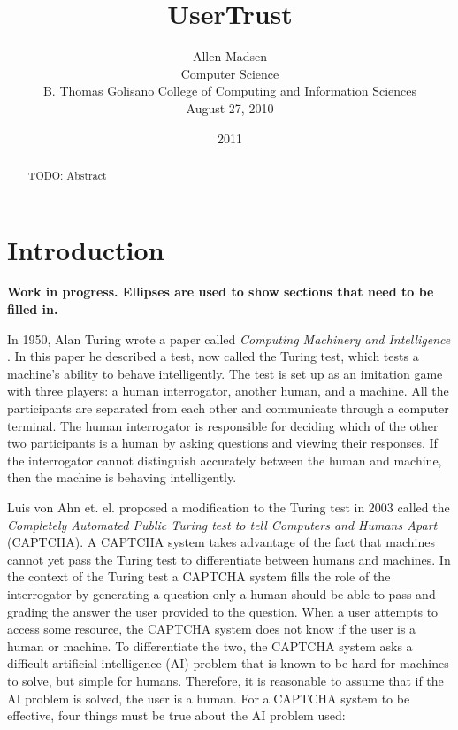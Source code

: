 \documentclass[journal, 12pt, onecolumn, draftclsnofoot]{IEEEtran}
\begin{document}
\title{\Large\bf UserTrust}
\date{2011}
\author{Allen Madsen \\ Computer Science \\ B. Thomas Golisano College of Computing and Information Sciences \\ August 27, 2010
}
\maketitle

\begin{abstract}

TODO: Abstract

\nocite{*}

\end{abstract}

\section{Introduction}
\label{Introduction}

\textbf{Work in progress. Ellipses are used to show sections that need to be filled in.}

In 1950, Alan Turing wrote a paper called \emph{Computing Machinery and Intelligence} \cite{turing}. In this paper he described a test, now called the Turing test, which tests a machine's ability to behave intelligently. The test is set up as an imitation game with three players: a human interrogator, another human, and a machine. All the participants are separated from each other and communicate through a computer terminal. The human interrogator is responsible for deciding which of the other two participants is a human by asking questions and viewing their responses. If the interrogator cannot distinguish accurately between the human and machine, then the machine is behaving intelligently.

Luis von Ahn et. el. \cite{vonahn} proposed a modification to the Turing test in 2003 called the \emph{Completely Automated Public Turing test to tell Computers and Humans Apart} (CAPTCHA). A CAPTCHA system takes advantage of the fact that machines cannot yet pass the Turing test to differentiate between humans and machines. In the context of the Turing test a CAPTCHA system fills the role of the interrogator by generating a question only a human should be able to pass and grading the answer the user provided to the question. When a user attempts to access some resource, the CAPTCHA system does not know if the user is a human or machine. To differentiate the two, the CAPTCHA system asks a difficult artificial intelligence (AI) problem that is known to be hard for machines to solve, but simple for humans. Therefore, it is reasonable to assume that if the AI problem is solved, the user is a human. For a CAPTCHA system to be effective, four things must be true about the AI problem used:
\end{document}
